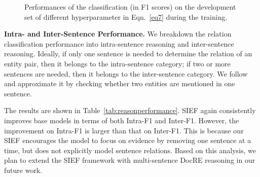 \documentclass[11pt]{article}
\begin{document}
\begin{figure*}[ht!]
{\begin{minipage}[b]{0.32\linewidth}
\begin{tikzpicture}
		\end{tikzpicture}
		\end{minipage}
    \hspace{0.35cm}
    \begin{minipage}[b]{0.32\linewidth}
    \centering
		\end{minipage}}\vspace{-.35cm}
		\caption{\label{fig:hypertheta}Performances of the classification (in F1 scores) on the development set of different hyperparameter  in Eqn.~\eqref{eq7} during the training.}\vspace{-.2cm}
\end{figure*}

\textbf{Intra- and Inter-Sentence Performance.}
We breakdown the relation classification performance into intra-sentence reasoning and inter-sentence reasoning. Ideally, if only one sentence is needed to determine the relation of an entity pair, then it belongs to the intra-sentence category; if two or more sentences are needed, then it belongs to the inter-sentence category. We follow~ and approximate it by checking whether two entities are mentioned in one sentence.

The results are shown in Table~\ref{tab:reasonperformance}. SIEF again consistently improves base models in terms of both Intra-F1 and Inter-F1. However, the improvement on Intra-F1 is larger than that on Inter-F1. This is because our SIEF encourages the model to focus on evidence by removing one sentence at a time, but does not explicitly model sentence relations. Based on this analysis, we plan to extend the SIEF framework with multi-sentence DocRE reasoning in our future work.
\end{document}
